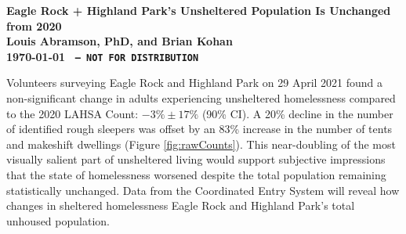 \documentclass[11pt]{article}
\def\bfr{\bf\color{red}}
\begin{document}

\begin{center}
	\Large\bf Eagle Rock + Highland Park's Unsheltered Population Is Unchanged from 2020\\
	\vspace{1ex}
	{\normalsize\rm Louis Abramson, PhD, and Brian Kohan\\ \today 
	}{\bfr \texttt{ -- NOT FOR DISTRIBUTION}}
\end{center}

 Volunteers surveying Eagle Rock and Highland Park on 29 April 2021 found  
a non-significant change in adults experiencing unsheltered homelessness compared to the 2020 
LAHSA Count: $-3\%\pm17\%$ (90\% CI). A 20\% decline in the number of identified rough 
sleepers was offset by an 83\% increase in the number of tents and makeshift dwellings 
(Figure \ref{fig:rawCounts}). This near-doubling of the most visually salient part of unsheltered 
living would support subjective impressions that the state of homelessness worsened despite the 
total population remaining statistically unchanged. Data from the Coordinated Entry System will 
reveal how changes in sheltered homelessness Eagle Rock and Highland Park's total unhoused 
population.

\end{document}
